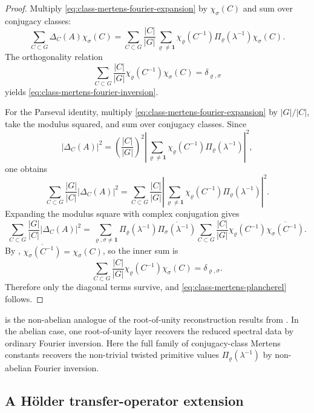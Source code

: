 \begin{proof}
  Multiply \eqref{eq:class-mertens-fourier-expansion} by
  \(\chi_\sigma(C)\) and sum over conjugacy classes:
  \[
    \sum_{C\subset G}\Delta_C(A)\chi_\sigma(C)
    =
    \sum_{C\subset G}\frac{|C|}{|G|}
      \sum_{\varrho\neq\mathbf 1}
        \chi_\varrho(C^{-1})\Pi_\varrho(\lambda^{-1})\chi_\sigma(C).
  \]
  The orthogonality relation
  \[
    \sum_{C\subset G}\frac{|C|}{|G|}
      \chi_\varrho(C^{-1})\chi_\sigma(C)
    =\delta_{\varrho,\sigma}
  \]
  yields \eqref{eq:class-mertens-fourier-inversion}.

  For the Parseval identity, multiply
  \eqref{eq:class-mertens-fourier-expansion} by \(|G|/|C|\), take the
  modulus squared, and sum over conjugacy classes. Since
  \[
    |\Delta_C(A)|^2
    =
    \left(\frac{|C|}{|G|}\right)^2
    \left|
      \sum_{\varrho\neq\mathbf 1}
        \chi_\varrho(C^{-1})\Pi_\varrho(\lambda^{-1})
    \right|^2,
  \]
  one obtains
  \[
    \sum_{C\subset G}\frac{|G|}{|C|}|\Delta_C(A)|^2
    =
    \sum_{C\subset G}\frac{|C|}{|G|}
      \left|\sum_{\varrho\neq\mathbf 1}
        \chi_\varrho(C^{-1})\Pi_\varrho(\lambda^{-1})\right|^2.
  \]
  Expanding the modulus square with complex conjugation gives
  \[
    \sum_{C\subset G}\frac{|G|}{|C|}|\Delta_C(A)|^2
    =
    \sum_{\varrho,\sigma\neq\mathbf 1}
      \Pi_\varrho(\lambda^{-1})
      \overline{\Pi_\sigma(\lambda^{-1})}
      \sum_{C\subset G}\frac{|C|}{|G|}
        \chi_\varrho(C^{-1})
        \overline{\chi_\sigma(C^{-1})}.
  \]
  By ,
  \(\overline{\chi_\sigma(C^{-1})}=\chi_\sigma(C)\), so the inner sum is
  \[
    \sum_{C\subset G}\frac{|C|}{|G|}
      \chi_\varrho(C^{-1})\chi_\sigma(C)
    =\delta_{\varrho,\sigma}.
  \]
  Therefore only the diagonal terms survive, and
  \eqref{eq:class-mertens-plancherel} follows.
\end{proof}

\begin{remark}
   is the non-abelian analogue of the
  root-of-unity reconstruction results from . In
  the abelian case, one root-of-unity layer recovers the reduced
  spectral data by ordinary Fourier inversion. Here the full family of
  conjugacy-class Mertens constants recovers the non-trivial twisted
  primitive values \(\Pi_\varrho(\lambda^{-1})\) by non-abelian Fourier
  inversion.
\end{remark}

\subsection{A H\"older transfer-operator extension}

